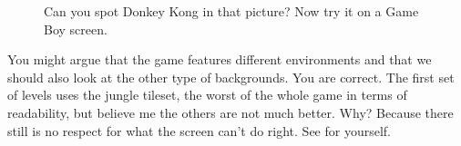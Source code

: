 \documentclass{book}
\begin{document}
\FloatBarrier\vspace{\baselineskip}\begin{figure}[H]\caption*{Can you spot Donkey Kong in that picture? Now try it on a Game Boy screen.}\end{figure}
You might argue that the game features different environments and that we should also look at the other type of backgrounds. You are correct. The first set of levels uses the jungle tileset, the worst of the whole game in terms of readability, but believe me the others are not much better. Why? Because there still is no respect for what the screen can’t do right. See for yourself.\par
\FloatBarrier\vspace{\baselineskip}\centering
\begin{minipage}{0.45\linewidth}\end{minipage}\vspace{2pt}
\begin{minipage}{0.45\linewidth}\end{minipage}\vspace{2pt}
\begin{minipage}{0.45\linewidth}\end{minipage}\vspace{2pt}
\begin{minipage}{0.45\linewidth}\end{minipage}\vspace{2pt}
\begin{minipage}{0.45\linewidth}\end{minipage}\vspace{2pt}
\begin{minipage}{0.45\linewidth}\end{minipage}\vspace{2pt}
\begin{minipage}{0.45\linewidth}\end{minipage}\vspace{2pt}
\end{document}
